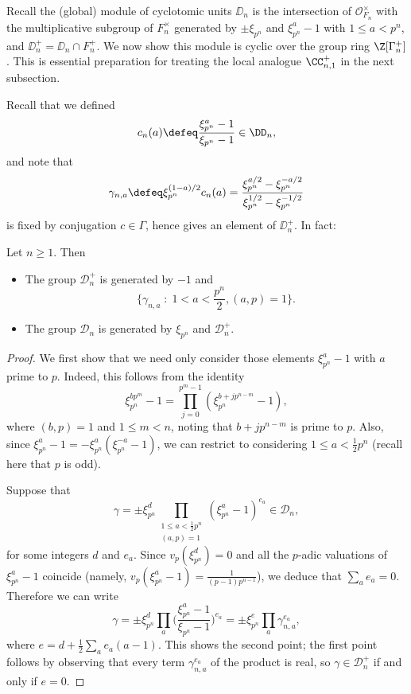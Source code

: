 \documentclass[a4paper,10pt, english, reqno]{smfart}
\newcommand{\GG}{\Gamma}
\numberwithin{equation}{section}
\begin{document}
 Recall the (global) module of cyclotomic units $\DD_n$ is the intersection of $\mathscr{O}_{F_n}^\times$ with the multiplicative subgroup of $F_n^\times$ generated by $\pm \xi_{p^n}$ and $\xi_{p^n}^a-1$ with $1 \leq a < p^n$, and $\DD_n^+ = \DD_n \cap F_n^+$. We now show this module is cyclic over the group ring $\Z[\Gamma_n^+]$. This is essential preparation for treating the local analogue $\CC_{n,1}^+$ in the next subsection. 

 
  Recall that we defined
\[c_n(a) \defeq \frac{\xi_{p^n}^a - 1}{\xi_{p^n} - 1} \in \DD_n,\]
and note that
\[\gamma_{n,a} \defeq \xi_{p^n}^{(1-a)/2}c_n(a) = \frac{\xi_{p^n}^{a/2} - \xi_{p^n}^{-a/2}}{\xi_{p^n}^{1/2} - \xi_{p^n}^{-1/2}}\]
is fixed by conjugation $c \in \GG$, hence gives an element of $\DD_n^+$. In fact:

\begin{lemma} \label{lem:cyc units gen}
	Let $n \geq 1$. Then
	\begin{itemize}
		\item[(i)] The group $\mathscr{D}_n^+$ is generated by $-1$ and 
		\[ \bigg\{ \gamma_{n,a}  \; : \; 1 < a < \frac{p^n}{2}, (a,p) = 1 \bigg\}. \]
		\item[(ii)] The group $\mathscr{D}_n$ is generated by $\xi_{p^n}$ and $\mathscr{D}_n^+$.
	\end{itemize}
\end{lemma}

\begin{proof}
	We first show that we need only consider those elements $\xi_{p^n}^a - 1$ with $a$ prime to $p$. Indeed, this follows from the identity
	\[ \xi_{p^n}^{b p^m} - 1 = \prod_{j = 0}^{p^m - 1} (\xi_{p^n}^{b+jp^{n - m}} - 1), \] where $(b, p) = 1$ and $1 \leq m < n$, noting that $b+jp^{n - m}$ is prime to $p$. Also, since $\xi_{p^n}^a - 1 = -\xi_{p^n}^{a} (\xi_{p^n}^{-a} - 1)$, we can restrict to considering $1 \leq a < \frac{1}{2} p^n$ (recall here that $p$ is odd).
	
	Suppose that 
	\[
	 \gamma = \pm \xi_{p^n}^d \prod_{\substack{1 \leq a < \frac{1}{2}p^n \\ (a, p) = 1}} (\xi_{p^n}^a - 1)^{e_a} \in \mathscr{D}_n, 
	 \] for some integers $d$ and $e_a$. Since $v_p(\xi_{p^n}^d) = 0$ and all the $p$-adic valuations of $\xi_{p^n}^a - 1$ coincide (namely, $v_p(\xi_{p^n}^a - 1) = \frac{1}{(p - 1)p^{n - 1}}$), we deduce that $\sum_a e_a = 0$. Therefore we can write
	\[
	 \gamma = \pm \xi_{p^n}^d \prod_a \bigg( \frac{ \xi_{p^n}^a - 1}{\xi_{p^n} - 1} \bigg)^{e_a} = \pm \xi_{p^n}^e \prod_a \gamma_{n,a}^{e_a}, 
	 \] 
	 where $e = d + \frac{1}{2} \sum_a e_a (a - 1)$. This shows the second point; the first point follows by observing that every term $\gamma_{n,a}^{e_a}$ of the product is real, so $\gamma \in \mathscr{D}_n^+$ if and only if $e = 0$.
\end{proof}
\end{document}
